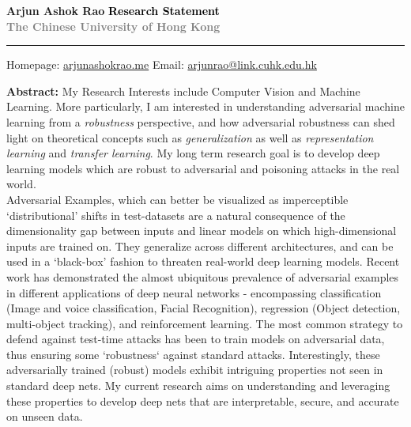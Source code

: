 \documentclass[12pt]{article}
\newcommand{\HRule}[1][\medskipamount]{\par
  \vspace*{\dimexpr-\parskip-\baselineskip+#1}
  \noindent\rule{\linewidth}{0.3mm}\par
  \vspace*{\dimexpr-\parskip-.3\baselineskip+#1}}
\begin{document}
\thispagestyle{empty}
\Large \textbf{Arjun Ashok Rao} \hfill \Large  \textbf{\textcolor{black}{\Large{Research Statement} }} \\ \textcolor{gray}{\textbf{\hspace*{0.25in}\normalsize{The Chinese University of Hong Kong}}}
\HRule

\small Homepage: \href{https://arjunashokrao.me}{arjunashokrao.me} \quad Email: \href{mailto:arjunrao@link.cuhk.edu.hk}{arjunrao@link.cuhk.edu.hk}

\bigskip

\textbf{Abstract:} My Research Interests include Computer Vision and Machine Learning. More particularly, I am interested in understanding adversarial machine learning from a \emph{robustness} perspective, and how adversarial robustness can shed light on theoretical concepts such as \emph{generalization} as well as \emph{representation learning} and \emph{transfer learning}. My long term research goal is to develop deep learning models which are robust to adversarial and poisoning attacks in the real world.  \\

Adversarial Examples, which can better be visualized as imperceptible `distributional' shifts in test-datasets are a natural consequence of the dimensionality gap between inputs and linear models on which high-dimensional inputs are trained on.
They generalize across different architectures, and can be used in a `black-box' fashion to threaten real-world deep learning models. Recent work has demonstrated the almost ubiquitous prevalence of adversarial examples in different applications of deep neural networks - encompassing classification (Image and voice classification, Facial Recognition), regression (Object detection, multi-object tracking), and reinforcement learning. The most common strategy to defend against test-time attacks has been to train models on adversarial data, thus ensuring some `robustness` against standard attacks. Interestingly, these adversarially trained (robust) models exhibit intriguing properties not seen in standard deep nets. My current research aims on understanding and leveraging these properties to develop deep nets that are interpretable, secure, and accurate on unseen data. 
    \\
\end{document}
